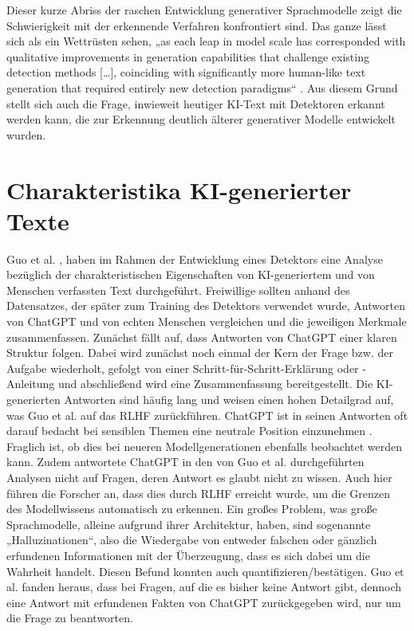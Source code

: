 Dieser kurze Abriss der raschen Entwicklung generativer Sprachmodelle zeigt die Schwierigkeit mit der erkennende Verfahren konfrontiert sind. Das ganze lässt sich als ein Wettrüsten sehen, „as each leap in model scale has corresponded with qualitative improvements in generation capabilities that challenge existing detection methods [\dots], coinciding with significantly more human-like text generation that required entirely new detection paradigms“ \autocite{kehkashan2025}. Aus diesem Grund stellt sich auch die Frage, inwieweit heutiger KI-Text mit Detektoren erkannt werden kann, die zur Erkennung deutlich älterer generativer Modelle entwickelt wurden.


\section{Charakteristika KI-generierter Texte}
\label{sec:charakteristika_ki}
Guo et al. \autocite{guo2023closechatgpthumanexperts}, haben im Rahmen der Entwicklung eines Detektors eine Analyse bezüglich der charakteristischen Eigenschaften von KI-generiertem und von Menschen verfassten Text durchgeführt. Freiwillige sollten anhand des Datensatzes, der später zum Training des Detektors verwendet wurde, Antworten von ChatGPT und von echten Menschen vergleichen und die jeweiligen Merkmale zusammenfassen. Zunächst fällt auf, dass Antworten von ChatGPT einer klaren Struktur folgen. Dabei wird zunächst noch einmal der Kern der Frage bzw. der Aufgabe wiederholt, gefolgt von einer Schritt-für-Schritt-Erklärung oder -Anleitung und abschließend wird eine Zusammenfassung bereitgestellt. Die KI-generierten Antworten sind häufig lang und weisen einen hohen Detailgrad auf, was Guo et al. \autocite{guo2023closechatgpthumanexperts} auf das RLHF zurückführen. ChatGPT ist in seinen Antworten oft darauf bedacht bei sensiblen Themen eine neutrale Position einzunehmen \autocite{guo2023closechatgpthumanexperts}. Fraglich ist, ob dies bei neueren Modellgenerationen ebenfalls beobachtet werden kann. Zudem antwortete ChatGPT in den von Guo et al. \autocite{guo2023closechatgpthumanexperts} durchgeführten Analysen nicht auf Fragen, deren Antwort es glaubt nicht zu wissen. Auch hier führen die Forscher an, dass dies durch RLHF erreicht wurde, um die Grenzen des Modellwissens automatisch zu erkennen. Ein großes Problem, was große Sprachmodelle, alleine aufgrund ihrer Architektur, haben, sind sogenannte „Halluzinationen“, also die Wiedergabe von entweder falschen oder gänzlich erfundenen Informationen mit der Überzeugung, dass es sich dabei um die Wahrheit handelt. Diesen Befund konnten \autocite{guo2023closechatgpthumanexperts} auch quantifizieren/bestätigen. Guo et al. \autocite{guo2023closechatgpthumanexperts} fanden heraus, dass bei Fragen, auf die es bisher keine Antwort gibt, dennoch eine Antwort mit erfundenen Fakten von ChatGPT zurückgegeben wird, nur um die Frage zu beantworten. \\

